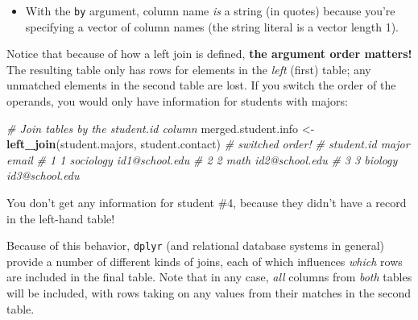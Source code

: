 \documentclass[]{book}
\newenvironment{Shaded}{\begin{snugshade}}{\end{snugshade}}
\newcommand{\KeywordTok}[1]{\textcolor[rgb]{0.13,0.29,0.53}{\textbf{#1}}}
\newcommand{\StringTok}[1]{\textcolor[rgb]{0.31,0.60,0.02}{#1}}
\newcommand{\CommentTok}[1]{\textcolor[rgb]{0.56,0.35,0.01}{\textit{#1}}}
\newcommand{\NormalTok}[1]{#1}
\providecommand{\tightlist}{%
  \setlength{\itemsep}{0pt}\setlength{\parskip}{0pt}}
\theoremstyle{definition}
\theoremstyle{definition}
\theoremstyle{remark}
\begin{document}
\begin{itemize}
\tightlist
\item
  With the \texttt{by} argument, column name \emph{is} a string (in
  quotes) because you're specifying a vector of column names (the string
  literal is a vector length 1).
\end{itemize}

Notice that because of how a left join is defined, \textbf{the argument
order matters!} The resulting table only has rows for elements in the
\emph{left} (first) table; any unmatched elements in the second table
are lost. If you switch the order of the operands, you would only have
information for students with majors:

\begin{Shaded}
\begin{Highlighting}[]
\CommentTok{# Join tables by the student.id column}
\NormalTok{merged.student.info <-}\StringTok{ }\KeywordTok{left_join}\NormalTok{(student.majors, student.contact)  }\CommentTok{# switched order!}
                        \CommentTok{#   student.id     major          email}
                        \CommentTok{# 1          1 sociology id1@school.edu}
                        \CommentTok{# 2          2      math id2@school.edu}
                        \CommentTok{# 3          3   biology id3@school.edu}
\end{Highlighting}
\end{Shaded}

You don't get any information for student \#4, because they didn't have
a record in the left-hand table!

Because of this behavior, \texttt{dplyr} (and relational database
systems in general) provide a number of different kinds of joins, each
of which influences \emph{which} rows are included in the final table.
Note that in any case, \emph{all} columns from \emph{both} tables will
be included, with rows taking on any values from their matches in the
second table.
\end{document}
